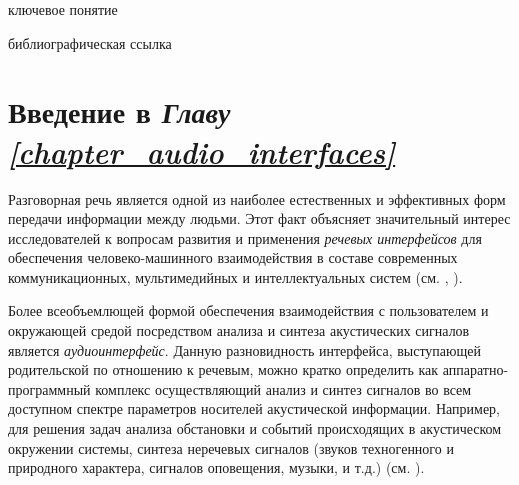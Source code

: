 \begin{SCn}
\bigskip

\begin{scnrelfromlist}{ключевое понятие}
\end{scnrelfromlist}

\bigskip

\begin{scnrelfromlist}{библиографическая ссылка}
\end{scnrelfromlist}

\end{SCn}


\section{Введение в \textit{Главу \ref{chapter_audio_interfaces}~}}
\label{sec_audio_interfaces_review}

Разговорная речь является одной из наиболее естественных и эффективных форм передачи информации между людьми. Этот факт объясняет значительный интерес исследователей к вопросам развития и применения \textit{речевых интерфейсов} для обеспечения человеко-машинного взаимодействия в составе современных коммуникационных, мультимедийных и интеллектуальных систем (см. , ).

Более всеобъемлющей формой обеспечения взаимодействия с пользователем и окружающей средой посредством анализа и синтеза акустических сигналов является \textit{аудиоинтерфейс}. Данную разновидность интерфейса, выступающей родительской по отношению к речевым, можно кратко определить  как аппаратно-программный комплекс осуществляющий анализ и синтез сигналов во всем доступном спектре параметров носителей акустической информации. Например, для решения задач анализа обстановки и событий происходящих в акустическом окружении системы, синтеза  неречевых сигналов (звуков техногенного и природного характера, сигналов оповещения, музыки, и т.д.) (см. ).

